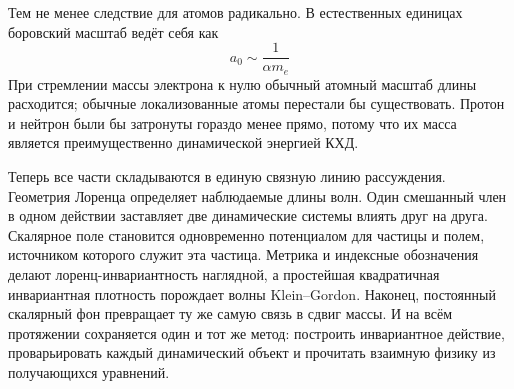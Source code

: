 Тем не менее следствие для атомов радикально. В естественных единицах боровский масштаб ведёт себя как
\begin{equation}
a_0\sim\frac{1}{\alpha m_e}
\end{equation}
При стремлении массы электрона к нулю обычный атомный масштаб длины расходится; обычные локализованные атомы перестали бы существовать.
Протон и нейтрон были бы затронуты гораздо менее прямо, потому что их
масса является преимущественно динамической энергией КХД.

Теперь все части складываются в единую связную линию рассуждения. Геометрия
Лоренца определяет наблюдаемые длины волн. Один смешанный член в одном действии заставляет
две динамические системы влиять друг на друга. Скалярное поле становится
одновременно потенциалом для частицы и полем, источником которого служит эта частица. Метрика
и индексные обозначения делают лоренц-инвариантность наглядной, а простейшая
квадратичная инвариантная плотность порождает волны Klein--Gordon. Наконец, постоянный
скалярный фон превращает ту же самую связь в сдвиг массы. И на всём протяжении
сохраняется один и тот же метод: построить инвариантное действие, проварьировать
каждый динамический объект и прочитать взаимную физику из получающихся уравнений.